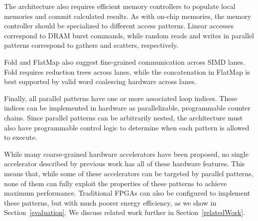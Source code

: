 
The architecture also requires efficient memory controllers to populate local memories and commit calculated results.
As with on-chip memories, the memory controller should be specialized to different access patterns.
Linear accesses correspond to DRAM burst commands, while random reads and writes in parallel patterns correspond to gathers and scatters, respectively.




Fold and FlatMap also suggest fine-grained communication across SIMD lanes. Fold requires reduction trees across lanes, while the concatenation in FlatMap is best supported by valid word coalescing hardware across lanes.

Finally, all parallel patterns have one or more associated loop indices. These indices can be implemented in hardware as parallelizable, programmable counter chains.
Since parallel patterns can be arbitrarily nested, the architecture must also have programmable control logic to determine when each pattern is allowed to execute.

While many coarse-grained hardware accelerators have been proposed, no single accelerator described by previous work has all of these hardware features.
This means that, while some of these accelerators can be targeted by parallel patterns, none of them can fully exploit the properties of these patterns to achieve maximum performance.
Traditional FPGAs can also be configured to implement these patterns, but with much poorer energy efficiency, as we show in Section~\ref{evaluation}.
We discuss related work further in Section~\ref{relatedWork}.
